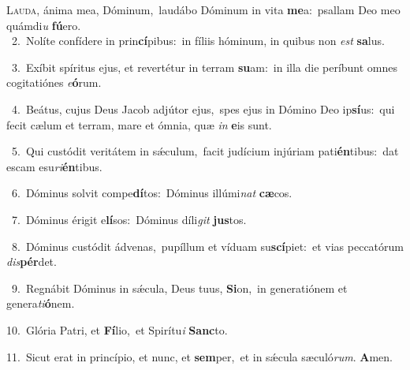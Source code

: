 \lettrine{\initial\textcolor{\initialcolor}{L}}{auda,} ánima mea, Dóminum,~\dagger laudábo Dóminum in vita \textbf{me}\-a:~\star psallam Deo meo quámdi\textit{u} \textbf{fú}\-ero.\\
{\numbfont\textcolor{\numbcolor}{~2.}}~Nolíte confídere in prin\-\textbf{cí}\-pibus:~\star in fíliis hóminum, in quibus non \textit{est} \textbf{sa}\-lus.\par
{\numbfont\textcolor{\numbcolor}{~3.}}~Exíbit spíritus ejus, et revertétur in terram \textbf{su}\-am:~\star in illa die períbunt omnes cogitatiónes \textit{e}\-\textbf{ó}rum.\par
{\numbfont\textcolor{\numbcolor}{~4.}}~Beátus, cujus Deus Jacob adjútor ejus,~\dagger spes ejus in Dómino Deo ip\-\textbf{sí}\-us:~\star qui fecit cælum et terram, mare et ómnia, quæ \textit{in} \textbf{e}\-is sunt.\par
{\numbfont\textcolor{\numbcolor}{~5.}}~Qui custódit veritátem in sǽculum,~\dagger facit judícium injúriam pati\-\textbf{én}\-tibus:~\star dat escam esu\-\textit{ri}\-\textbf{én}tibus.\par
{\numbfont\textcolor{\numbcolor}{~6.}}~Dóminus solvit compe\-\textbf{dí}\-tos:~\star Dóminus illúmi\textit{nat} \textbf{cæ}\-cos.\par
{\numbfont\textcolor{\numbcolor}{~7.}}~Dóminus érigit e\-\textbf{lí}\-sos:~\star Dóminus díli\textit{git} \textbf{jus}\-tos.\par
{\numbfont\textcolor{\numbcolor}{~8.}}~Dóminus custódit ádvenas,~\dagger pupíllum et víduam su\-\textbf{scí}\-piet:~\star et vias peccatórum \textit{dis}\-\textbf{pér}det.\par
{\numbfont\textcolor{\numbcolor}{~9.}}~Regnábit Dóminus in sǽcula, Deus tuus, \textbf{Si}\-on,~\star in generatiónem et genera\-\textit{ti}\-\textbf{ó}nem.\par
{\numbfont\textcolor{\numbcolor}{10.}}~Glória Patri, et \textbf{Fí}\-lio,~\star et Spirítu\textit{i} \textbf{Sanc}\-to.\par
{\numbfont\textcolor{\numbcolor}{11.}}~Sicut erat in princípio, et nunc, et \textbf{sem}\-per,~\star et in sǽcula sæculó\-\textit{rum}\-. \textbf{A}\-men.\par
